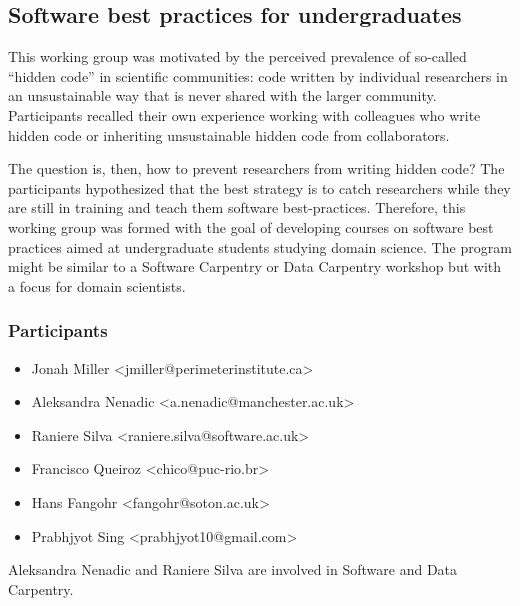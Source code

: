 \subsection{Software best practices for undergraduates}
\label{sec:best-practices-undergrads}



This working group was motivated by the perceived prevalence of
so-called ``hidden code'' in scientific communities: code written by
individual researchers in an unsustainable way that is never shared
with the larger community. Participants recalled their own experience
working with colleagues who write hidden code or inheriting
unsustainable hidden code from collaborators.

The question is, then, how to prevent researchers from writing hidden
code? The participants hypothesized that the best strategy is to catch
researchers while they are still in training and teach them software
best-practices. Therefore, this working group was formed with the goal
of developing courses on software best practices aimed at
undergraduate students studying domain science. The program might be
similar to a Software Carpentry or Data Carpentry workshop but with a
focus for domain scientists.

\subsubsection{Participants}

\begin{itemize}
  \item Jonah Miller <jmiller@perimeterinstitute.ca>
  \item Aleksandra Nenadic <a.nenadic@manchester.ac.uk>
  \item Raniere Silva <raniere.silva@software.ac.uk>
  \item Francisco Queiroz <chico@puc-rio.br>
  \item Hans Fangohr <fangohr@soton.ac.uk>
  \item Prabhjyot Sing <prabhjyot10@gmail.com>
\end{itemize}

\noindent Aleksandra Nenadic and Raniere Silva are involved
in Software and Data Carpentry.

